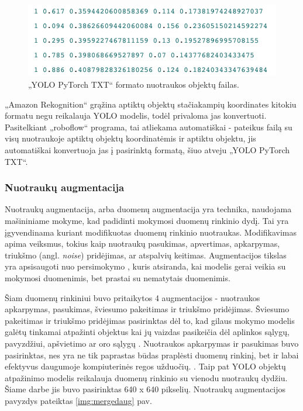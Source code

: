 \documentclass{VUMIFPSkursinis}
\begin{document}
\begin{figure}[H]
    \centering
    \includegraphics[scale=0.6]{img/formato_pvz.png}
    \caption{„YOLO PyTorch TXT“ formato nuotraukos objektų failas.}
    \label{img:format}
\end{figure}

„Amazon Rekognition“ grąžina aptiktų objektų stačiakampių koordinates kitokiu formatu negu reikalauja YOLO modelis, todėl privaloma jas konvertuoti. Pasitelkiant „roboflow“ programa, tai atliekama automatiškai - pateikus failą su visų nuotraukoje aptiktų objektų koordinatėmis ir aptiktu objektu, jis automatiškai konvertuoja jas į pasirinktą formatą, šiuo atveju „YOLO PyTorch TXT“.

\subsubsection{Nuotraukų augmentacija}
Nuotraukų augmentacija, arba duomenų augmentacija yra technika, naudojama mašininiame mokyme, kad padidinti mokymosi duomenų rinkinio dydį. Tai yra įgyvendinama kuriant modifikuotas duomenų rinkinio nuotraukas. Modifikavimas apima veiksmus, tokius kaip nuotraukų pasukimas, apvertimas, apkarpymas, triukšmo (angl. \emph{noise}) pridėjimas, ar atspalvių keitimas. Augmentacijos tikslas yra apsisaugoti nuo persimokymo \cite{perez2017effectiveness}, kuris atsiranda, kai modelis gerai veikia su mokymosi duomenimis, bet prastai su nematytais duomenimis. 

Šiam duomenų rinkiniui buvo pritaikytos 4 augmentacijos - nuotraukos apkarpymas, pasukimas, šviesumo pakeitimas ir triukšmo pridėjimas. Šviesumo pakeitimas ir triukšmo pridėjimas pasirinktas dėl to, kad gilaus mokymo modelis galėtų tinkamai atpažinti objektus kai jų vaizdas pasikeičia dėl aplinkos sąlygų, pavyzdžiui, apšvietimo ar oro sąlygų \cite{MUMUNI2022100258}. Nuotraukos apkarpymas ir pasukimas buvo pasirinktas, nes yra ne tik paprastas būdas praplėsti duomenų rinkinį, bet ir labai efektyvus daugumoje kompiuterinės regos užduočių. \cite{xu2016improved}. Taip pat YOLO objektų atpažinimo modelis reikalauja duomenų rinkinio su vienodu nuotraukų dydžiu. Šiame darbe jis buvo pasirinktas 640 x 640 pikselių. Nuotraukų augmentacijos pavyzdys pateiktas \ref{img:mergedaug} pav.
\end{document}
